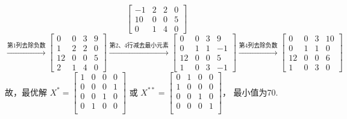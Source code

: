 \begin{solution}
$$\begin{bmatrix}
        -1 & 2  & 2  & 0 \\
        10 & 0  & 0  & 5 \\
        0  & 1  & 4  & 0
    \end{bmatrix}$$
    $$
    \xrightarrow{\text{第1列去除负数}}
    \begin{bmatrix}
        0  & 0  & 3  & 9 \\
        1  & 2  & 2  & 0 \\
        12 & 0  & 0  & 5 \\
        2  & 1  & 4  & 0
    \end{bmatrix}
    \xrightarrow{\text{第2、4行减去最小元素}}
    \begin{bmatrix}
        0  & 0  & 3  & 9 \\
        0  & 1  & 1  & -1\\
        12 & 0  & 0  & 5 \\
        1  & 0  & 3  & -1
    \end{bmatrix}
    \xrightarrow{\text{第4列去除负数}}
    \begin{bmatrix}
        0  & 0  & 3  & 10\\
        0  & 1  & 1  & 0 \\
        12 & 0  & 0  & 6 \\
        1  & 0  & 3  & 0
    \end{bmatrix}$$
    故，最优解
    $X^{*}=\begin{bmatrix}
        1  & 0  & 0  & 0  \\
        0  & 0  & 0  & 1  \\
        0  & 0  & 1  & 0  \\
        0  & 1  & 0  & 0  \\
    \end{bmatrix}$
    或
    $X^{**}=\begin{bmatrix}
        0  & 1  & 0  & 0  \\
        1  & 0  & 0  & 0  \\
        0  & 0  & 1  & 0  \\
        0  & 0  & 0  & 1  \\
    \end{bmatrix}$，
    最小值为70.
\end{solution}

